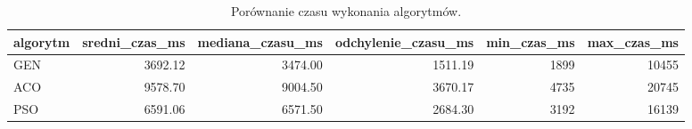 \begin{table}
\caption{Porównanie czasu wykonania algorytmów.}
\label{tab:czas_wykonania}
\begin{tabular}{lrrrrr}
\toprule
algorytm & sredni_czas_ms & mediana_czasu_ms & odchylenie_czasu_ms & min_czas_ms & max_czas_ms \\
\midrule
GEN & 3692.12 & 3474.00 & 1511.19 & 1899 & 10455 \\
ACO & 9578.70 & 9004.50 & 3670.17 & 4735 & 20745 \\
PSO & 6591.06 & 6571.50 & 2684.30 & 3192 & 16139 \\
\bottomrule
\end{tabular}
\end{table}
